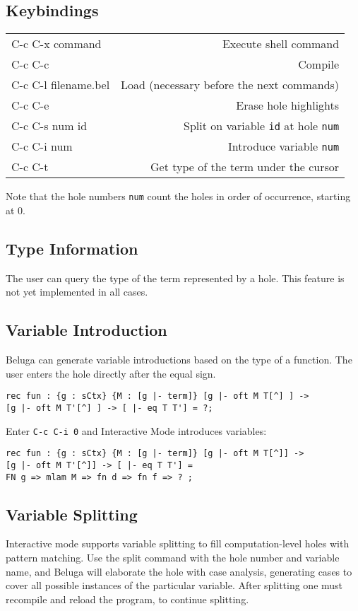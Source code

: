 \documentclass[11pt]{article}
\begin{document}
\subsection{Keybindings}

\begin{tabular}{ l r }
C-c C-x command & Execute shell command \\
C-c C-c & Compile \\
C-c C-l filename.bel & Load (necessary before the next commands) \\
C-c C-e & Erase hole highlights \\
C-c C-s num id & Split on variable \texttt{id} at hole \texttt{num} \\
C-c C-i num & Introduce variable \texttt{num} \\
C-c C-t & Get type of the term under the cursor \\
\end{tabular}

Note that the hole numbers \texttt{num} count the holes in order of occurrence, starting at 0.

\subsection{Type Information}
The user can query the type of the term represented by a hole. This feature is not yet implemented in all cases.

\subsection{Variable Introduction}
Beluga can generate variable introductions based on the type of a function. The user enters the hole directly after the equal sign. 
\begin{verbatim}
rec fun : {g : sCtx} {M : [g |- term]} [g |- oft M T[^] ] -> 
[g |- oft M T'[^] ] -> [ |- eq T T'] = ?;
\end{verbatim}

Enter \texttt{C-c C-i 0} and Interactive Mode introduces variables:
\begin{verbatim}
rec fun : {g : sCtx} {M : [g |- term]} [g |- oft M T[^]] -> 
[g |- oft M T'[^]] -> [ |- eq T T'] =
FN g => mlam M => fn d => fn f => ? ;
\end{verbatim}


\subsection{Variable Splitting}
Interactive mode supports variable splitting to fill computation-level
holes with pattern matching. Use the split command with the hole
number and variable name, and Beluga will elaborate the hole with case
analysis, generating cases to cover all possible instances of the
particular variable. After splitting one must recompile and reload the
program, to continue splitting.
\end{document}
